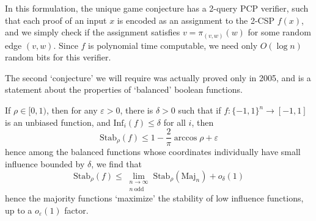 In this formulation, the unique game conjecture has a 2-query PCP verifier, such that each proof of an input $x$ is encoded as an assignment to the 2-CSP $f(x)$, and we simply check if the assignment satisfies $v = \pi_{(v,w)}(w)$ for some random edge $(v,w)$. Since $f$ is polynomial time computable, we need only $O(\log n)$ random bits for this verifier.

The second `conjecture' we will require was actually proved only in 2005, and is a statement about the properties of `balanced' boolean functions.

\begin{theorem}
    If $\rho \in [0,1)$, then for any $\varepsilon > 0$, there is $\delta > 0$ such that if $f: \{ -1, 1 \}^n \to [-1,1]$ is an unbiased function, and $\text{Inf}_i(f) \leq \delta$ for all $i$, then
    \[ \text{Stab}_\rho(f) \leq 1 - \frac{2}{\pi} \arccos \rho + \varepsilon \]
    hence among the balanced functions whose coordinates individually have small influence bounded by $\delta$, we find that
    \[ \text{Stab}_\rho(f) \leq \lim_{\substack{n \to \infty\\n\ \text{odd}}} \text{Stab}_\rho(\text{Maj}_n) + o_\delta(1) \]
    hence the majority functions `maximize' the stability of low influence functions, up to a $o_\varepsilon(1)$ factor.
\end{theorem}

